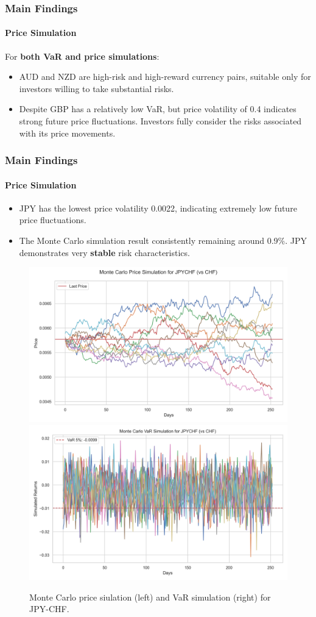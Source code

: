 \documentclass[10pt]{beamer}
\begin{document}
\begin{frame}
\frametitle{Main Findings}
\framesubtitle{Price Simulation}
For \textbf{both VaR and price simulations}:
\begin{itemize}
    \item AUD and NZD are high-risk and high-reward currency pairs, suitable only for investors willing to take substantial risks.
    \item Despite GBP has a relatively low VaR, but price volatility of 0.4 indicates strong future price fluctuations. Investors fully consider the risks associated with its price movements.
\end{itemize}
\end{frame}
\begin{frame}
\frametitle{Main Findings}
\framesubtitle{Price Simulation}
\begin{itemize}
    \item JPY has the lowest price volatility 0.0022, indicating extremely low future price fluctuations. 
    \item The Monte Carlo simulation result consistently remaining around 0.9\%. JPY demonstrates very \textbf{stable} risk characteristics. 
\end{itemize}
\begin{figure}
    \centering  \includegraphics[width=0.48\linewidth]{../../reports/figures/monte_carlo_price_simulation_JPYCHF_vs_CHF.png}  \label{fig:monte_carlo_price_simulation_JPYCHF_vs_CHF}
    \includegraphics[width=0.48\linewidth]{../../reports/figures/monte_carlo_var_simulation_JPYCHF_vs_CHF.png}  \label{fig:monte_carlo_var_simulation_JPYCHF_vs_CHF}
    \caption{\footnotesize Monte Carlo price siulation (left) and VaR simulation (right) for JPY-CHF.}
\end{figure}
\end{frame}
\end{document}
